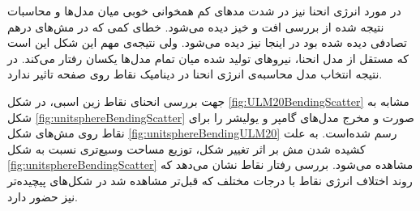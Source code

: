 در مورد انرژی انحنا نیز در شد‌ت مدهای کم همخوانی خوبی میان مدل‌ها و محاسبات نتیجه شده از بررسی افت و خیز دیده می‌شود. خطای کمی که در مش‌های درهم تصادفی دیده‌ شده بود در اینجا نیز دیده می‌شود. ولی نتیجه‌ی مهم این شکل این است که مستقل از مدل انحنا، نیروهای تولید شده میان تمام مدل‌ها یکسان رفتار می‌کند. در نتیجه انتخاب مدل محاسبه‌ی انرژی انحنا در دینامیک نقاط روی صفحه تاثیر ندارد.



جهت بررسی انحنای نقاط زین اسبی، در شکل 
\ref{fig:ULM20BendingScatter}
مشابه به شکل
\ref{fig:unitsphereBendingScatter}
صورت و مخرج مدل‌های گامپر و یولیشر را برای نقاط روی مش‌های شکل 
\ref{fig:unitsphereBendingULM20}
رسم شده‌است. به علت کشیده شدن مش‌ بر اثر تغییر شکل، توزیع مساحت وسیع‌تری نسبت به شکل 
\ref{fig:unitsphereBendingScatter}
مشاهده می‌شود. بررسی رفتار نقاط نشان می‌دهد که روند اختلاف انرژی نقاط با درجات مختلف که قبل‌تر مشاهده شد در شکل‌های پیچیده‌تر نیز حضور دارد.




